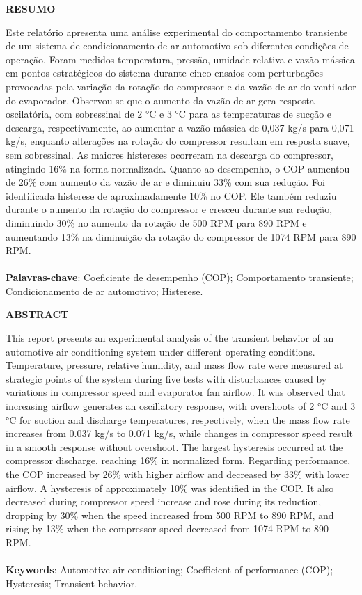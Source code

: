 \onehalfspacing  %
\begin{center}
    \textbf{RESUMO}
\end{center}

{\noindent Este relatório apresenta uma análise experimental do comportamento transiente de um sistema de condicionamento de ar automotivo sob diferentes condições de operação. Foram medidos temperatura, pressão, umidade relativa e vazão mássica em pontos estratégicos do sistema durante cinco ensaios com perturbações provocadas pela variação da rotação do compressor e da vazão de ar do ventilador do evaporador. Observou-se que o aumento da vazão de ar gera resposta oscilatória, com sobressinal de 2 °C e 3 °C para as temperaturas de sucção e descarga, respectivamente, ao aumentar a vazão mássica de 0,037 kg/s para 0,071 kg/s, enquanto alterações na rotação do compressor resultam em resposta suave, sem sobressinal. As maiores histereses ocorreram na descarga do compressor, atingindo 16\% na forma normalizada. Quanto ao desempenho, o COP aumentou de 26\%  com aumento da vazão de ar e diminuiu 33\% com sua redução. Foi identificada histerese de aproximadamente 10\% no COP. Ele também reduziu durante o aumento da rotação do compressor e cresceu  durante sua redução, diminuindo 30\% no aumento da rotação de 500 RPM para 890 RPM e aumentando 13\% na diminuição da rotação do compressor de 1074 RPM para 890 RPM.
\\\\
\noindent \textbf{Palavras-chave}: Coeficiente de desempenho (COP); Comportamento transiente; Condicionamento de ar automotivo; Histerese. 
}
\newpage

\begin{center}
    \textbf{ABSTRACT}
\end{center}

{\noindent This report presents an experimental analysis of the transient behavior of an automotive air conditioning system under different operating conditions. Temperature, pressure, relative humidity, and mass flow rate were measured at strategic points of the system during five tests with disturbances caused by variations in compressor speed and evaporator fan airflow. It was observed that increasing airflow generates an oscillatory response, with overshoots of 2 °C and 3 °C for suction and discharge temperatures, respectively, when the mass flow rate increases from 0.037 kg/s to 0.071 kg/s, while changes in compressor speed result in a smooth response without overshoot. The largest hysteresis occurred at the compressor discharge, reaching 16\% in normalized form. Regarding performance, the COP increased by 26\% with higher airflow and decreased by 33\% with lower airflow. A hysteresis of approximately 10\% was identified in the COP. It also decreased during compressor speed increase and rose during its reduction, dropping by 30\% when the speed increased from 500 RPM to 890 RPM, and rising by 13\% when the compressor speed decreased from 1074 RPM to 890 RPM.
\\\\
\noindent \textbf{Keywords}: Automotive air conditioning; Coefficient of performance (COP); Hysteresis; Transient behavior.
}

\onehalfspacing
